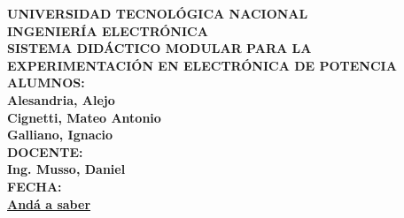 \begin{titlepage}
    \centering
    \vspace*{2cm}
    
    \textbf{\Large{UNIVERSIDAD TECNOLÓGICA NACIONAL}} \\ [0.3cm]
    
    \textbf{\Large{INGENIERÍA ELECTRÓNICA}}\\ [2cm]
    
    \textbf{\huge{SISTEMA DIDÁCTICO MODULAR PARA LA EXPERIMENTACIÓN EN ELECTRÓNICA DE POTENCIA}}\\ [2cm]
    
    \textbf{\Large{ALUMNOS:}}\\
    \textbf{Alesandria, Alejo}\\
    \textbf{Cignetti, Mateo Antonio}\\
    \textbf{Galliano, Ignacio}\\[1cm]
    
    \textbf{\Large{DOCENTE:}}\\
    \textbf{Ing. Musso, Daniel}\\[1cm]
    
    \textbf{\Large{FECHA:}}\\[0.3cm]
    \textbf{\href{https://www.youtube.com/watch?v=VpKxIailndE}{Andá a saber}}\\[3cm]
    
    \vfill
\end{titlepage}